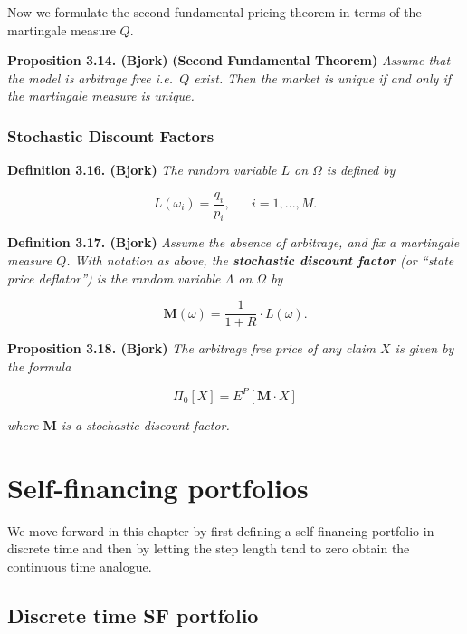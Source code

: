 \documentclass[
]{book}
\begin{document}
Now we formulate the second fundamental pricing theorem in terms of the martingale measure \(Q\).

\textbf{Proposition 3.14. (Bjork)} \textbf{(Second Fundamental Theorem)} \emph{Assume that the model is arbitrage free i.e.~\(Q\) exist. Then the market is unique if and only if the martingale measure is unique.}

\hypertarget{stochastic-discount-factors}{%
\subsubsection{Stochastic Discount Factors}\label{stochastic-discount-factors}}

\textbf{Definition 3.16. (Bjork)} \emph{The random variable \(L\) on \(\Omega\) is defined by}

\[
L(\omega_i)=\frac{q_i}{p_i},\hspace{20pt} i=1,...,M.
\]

\textbf{Definition 3.17. (Bjork)} \emph{Assume the absence of arbitrage, and fix a martingale measure \(Q\). With notation as above, the \textbf{stochastic discount factor} (or ``state price deflator'') is the random variable \(\Lambda\) on \(\Omega\) by}

\[
\mathbf{M}(\omega)=\frac{1}{1+R}\cdot L(\omega).\tag{3.19}
\]

\textbf{Proposition 3.18. (Bjork)} \emph{The arbitrage free price of any claim \(X\) is given by the formula}

\[
\Pi_0[X]=E^P[\mathbf{M}\cdot X]\tag{3.20}
\]

\emph{where \(\mathbf{M}\) is a stochastic discount factor.}

\pagebreak

\hypertarget{self-financing-portfolios}{%
\section{Self-financing portfolios}\label{self-financing-portfolios}}

We move forward in this chapter by first defining a self-financing portfolio in discrete time and then by letting the step length tend to zero obtain the continuous time analogue.

\hypertarget{discrete-time-sf-portfolio}{%
\subsection{Discrete time SF portfolio}\label{discrete-time-sf-portfolio}}
\end{document}
